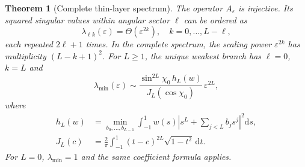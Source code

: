 \documentclass[aps,prd,reprint,amsmath,amssymb,nofootinbib,
longbibliography]{revtex4-2}
\newtheorem{theorem}{Theorem}
\newcommand{\dd}{\mathrm d}
\newcommand{\ee}{\varepsilon}
\begin{document}
\begin{theorem}[Complete thin-layer spectrum]
\label{thm:thin}
The operator $A_\ee$ is injective. Its squared singular values within
angular sector $\ell$ can be ordered as
\begin{equation}
 \lambda_{\ell k}(\ee)=\Theta(\ee^{2k}),
 \quad k=0,\ldots,L-\ell,
 \label{eq:powers}
\end{equation}
each repeated $2\ell+1$ times. In the complete spectrum, the scaling
power $\ee^{2k}$ has multiplicity $(L-k+1)^2$.
For $L\geq1$, the unique weakest branch has $\ell=0$, $k=L$ and
\begin{equation}
 \lambda_{\min}(\ee)\sim
 \frac{\sin^{2L}\chi_0\,h_L(w)}{J_L(\cos\chi_0)}\,\ee^{2L},
 \label{eq:mincoefficient}
\end{equation}
where
\begin{align}
 h_L(w)&=\min_{b_0,\ldots,b_{L-1}}
 \int_{-1}^1w(s)\left|s^L+\sum_{j<L}b_js^j\right|^2\dd s,\\
 J_L(c)&=\frac2\pi\int_{-1}^1(t-c)^{2L}\sqrt{1-t^2}\,\dd t.
 \label{eq:hJ}
\end{align}
For $L=0$, $\lambda_{\min}=1$ and the same coefficient formula applies.
\end{theorem}
\end{document}

